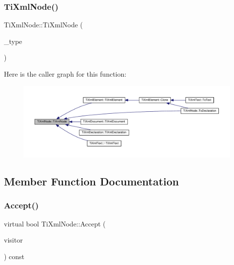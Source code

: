 \mbox{\label{class_ti_xml_node_a3f46721695868667113c7487ff123f20}} 
\subsubsection{\texorpdfstring{Ti\+Xml\+Node()}{TiXmlNode()}}
{\footnotesize\ttfamily Ti\+Xml\+Node\+::\+Ti\+Xml\+Node (\begin{DoxyParamCaption}\item[{\hyperlink{class_ti_xml_node_a836eded4920ab9e9ef28496f48cd95a2}{Node\+Type}}]{\+\_\+type }\end{DoxyParamCaption})\hspace{0.3cm}{\ttfamily [protected]}}

Here is the caller graph for this function\+:
\nopagebreak
\begin{figure}[H]
\begin{center}
\leavevmode
\includegraphics[width=350pt]{class_ti_xml_node_a3f46721695868667113c7487ff123f20_icgraph}
\end{center}
\end{figure}


\subsection{Member Function Documentation}
\mbox{\label{class_ti_xml_node_acc0f88b7462c6cb73809d410a4f5bb86}} 
\subsubsection{\texorpdfstring{Accept()}{Accept()}}
{\footnotesize\ttfamily virtual bool Ti\+Xml\+Node\+::\+Accept (\begin{DoxyParamCaption}\item[{\hyperlink{class_ti_xml_visitor}{Ti\+Xml\+Visitor} $\ast$}]{visitor }\end{DoxyParamCaption}) const\hspace{0.3cm}{\ttfamily [pure virtual]}}


